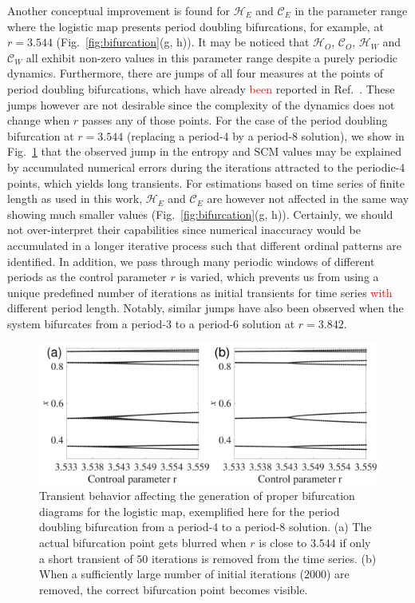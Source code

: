 \documentclass[aip,cha,reprint,nofootinbib]{revtex4-1}
\begin{document}
Another conceptual improvement is found for $\mathcal{H}_E$ and $\mathcal{C}_E$ in the parameter range where the logistic map presents period doubling bifurcations, for example, at $r = 3.544$ (Fig.~\ref{fig:bifurcation}(g, h)). It may be noticed that $\mathcal{H}_O$, $\mathcal{C}_O$, $\mathcal{H}_W$ and $\mathcal{C}_W$ all exhibit non-zero values in this parameter range despite a purely periodic dynamics. Furthermore, there are jumps of all four measures at the points of period doubling bifurcations, which have already \textcolor{red}{been} reported in Ref.~\cite{BandtPRL2002}. These jumps however are not desirable since the complexity of the dynamics does not change when $r$ passes any of those points. For the case of the period doubling bifurcation at $r=3.544$ (replacing a period-4 by a period-8 solution), we show in Fig.~\ref{fig:transient} that the observed jump in the entropy and SCM values may be explained by accumulated numerical errors during the iterations attracted to the periodic-4 points, which yields long transients. For estimations based on time series of finite length as used in this work, $\mathcal{H}_E$ and $\mathcal{C}_E$ are however not affected in the same way showing much smaller values (Fig.~\ref{fig:bifurcation}(g, h)). Certainly, we should not over-interpret their capabilities since numerical inaccuracy would be accumulated in a longer iterative process such that different ordinal patterns are identified. In addition, we pass through many periodic windows of different periods as the control parameter $r$ is varied, which prevents us from using a unique predefined number of iterations as initial transients for time series \textcolor{red}{with} different period length. Notably, similar jumps have also been observed when the system bifurcates from a period-3 to a period-6 solution at $r = 3.842$. 

\begin{figure}
	\centering
	\includegraphics[width=\columnwidth]{period4_exampleTransients.pdf}
\caption{\small{Transient behavior affecting the generation of proper bifurcation diagrams for the logistic map, exemplified here for the period doubling bifurcation from a period-4 to a period-8 solution. (a) The actual bifurcation point gets blurred when $r$ is close to $3.544$ if only a short transient of $50$ iterations is removed from the time series. (b) When a sufficiently large number of initial iterations ($2000$) are removed, the correct bifurcation point becomes visible. }\label{fig:transient}}
\end{figure}
\end{document}
